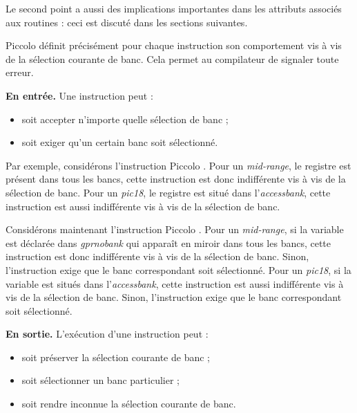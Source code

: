 Le second point a aussi des implications importantes dans les attributs associés aux routines : ceci est discuté dans les sections suivantes.









Piccolo définit précisément pour chaque instruction son comportement vis à vis de la sélection courante de banc. Cela permet au compilateur de signaler toute erreur.

\textbf{En entrée.} Une instruction peut :
\begin{itemize}
  \item soit accepter n'importe quelle sélection de banc ;
  \item soit exiger qu'un certain banc soit sélectionné.
\end{itemize}

Par exemple, considérons l'instruction Piccolo . Pour un \emph{mid-range}, le registre  est présent dans tous les bancs, cette instruction est donc indifférente vis à vis de la sélection de banc. Pour un \emph{pic18}, le registre  est situé dans l'\emph{accessbank}, cette instruction est aussi indifférente vis à vis de la sélection de banc. 

Considérons maintenant l'instruction Piccolo . Pour un \emph{mid-range}, si la variable  est déclarée dans \emph{gprnobank} qui apparaît en miroir dans tous les bancs, cette instruction est donc indifférente vis à vis de la sélection de banc. Sinon, l'instruction exige que le banc correspondant soit sélectionné. Pour un \emph{pic18}, si la variable  est situés dans l'\emph{accessbank}, cette instruction est aussi indifférente vis à vis de la sélection de banc.  Sinon, l'instruction exige que le banc correspondant soit sélectionné. 


\textbf{En sortie.} L'exécution d'une instruction peut :
\begin{itemize}
  \item soit préserver la sélection courante de banc ;
  \item soit sélectionner un banc particulier ;
  \item soit rendre inconnue la sélection courante de banc.
\end{itemize}


